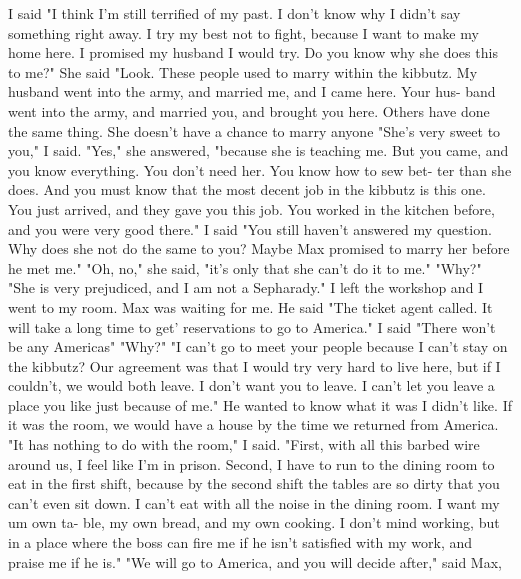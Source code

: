 I said "I think I’m still terrified of my past.
I don't know why 
I didn't say something right away.
I try my best not to fight, because 
I want to make my home here.
I promised my husband I would try.
Do 
you know why she does this to me?"
She said "Look.
These people used to marry within the kibbutz.
My 
husband went into the army, and married me, and I came here.
Your hus-
band went into the army, and married you, and brought you here.
Others 
have done the same thing.
She doesn't have a chance to marry anyone 
"She's very sweet to you," I said.
"Yes," she answered, "because she is teaching me.
But you came, 
and you know everything.
You don't need her.
You know how to sew bet-
ter than she does.
And you must know that the most decent job in the 
kibbutz is this one.
You just arrived, and they gave you this job.
You worked in the kitchen before, and you were very good there."
I said "You still haven't answered my question.
Why does she not 
do the same to you?
Maybe Max promised to marry her before he met me."
"Oh, no," she said, "it's only that she can't do it to me."
"Why?"
"She is very prejudiced, and I am not a Sepharady."
I left the workshop and I went to my room.
Max was waiting for 
me.
He said "The ticket agent called.
It will take a long time to get' 
reservations to go to America."
I said "There won't be any Americas" 
"Why?"
"I can't go to meet your people because I can't stay on the kibbutz?
Our agreement was that I would try very hard to live here, but if I 
couldn't, we would both leave.
I don't want you to leave.
I can't let 
you leave a place you like just because of me."
He wanted to know what it was I didn't like.
If it was the room, 
we would have a house by the time we returned from America.
"It has nothing to do with the room," I said.
"First, with all 
this barbed wire around us, I feel like I'm in prison.
Second, I have 
to run to the dining room to eat in the first shift, because by the
second shift the tables are so dirty that you can't even sit down.
I 
can't eat with all the noise in the dining room.
I want my um own ta-
ble, my own bread, and my own cooking.
I don't mind working, but in a 
place where the boss can fire me if he isn't satisfied with my work, 
and praise me if he is."
"We will go to America, and you will decide after," said Max, 

